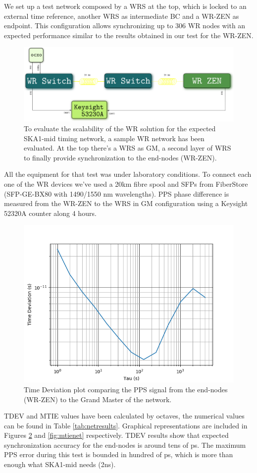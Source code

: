 We set up a test network composed by a WRS at the top, which is locked to an 
external time reference, another WRS as intermediate BC and a WR-ZEN as 
endpoint. This configuration allows synchronizing up to 306 WR nodes with an 
expected performance similar to the results obtained in our test for the WR-ZEN.

\begin{figure}
	\centering
	\includegraphics[width=0.7\linewidth]{img/prueba_red}
	\caption[WR Scalability test's setup for SKA]{To evaluate the scalability 
	of the WR solution for the expected SKA1-mid timing network, a sample WR 
	network has been evaluated. At the top there's a WRS as GM, a second layer 
	of WRS to finally provide synchronization to the end-nodes (WR-ZEN).}
	\label{fig:pruebared}
\end{figure}


All the equipment for that test was under laboratory conditions. To connect 
each one of the WR devices we've used a 20km fibre spool and SFPs from 
FiberStore (SFP-GE-BX80 with 1490/1550 nm wavelengths). PPS phase difference is 
measured from the WR-ZEN to the WRS in GM configuration using a Keysight 52320A 
counter along 4 hours.

\begin{figure}
	\centering
	\includegraphics[width=0.5\linewidth]{img/tdev_exp3}
	\caption[TDEV of the end-nodes in the scalability test.]{Time Deviation 
	plot comparing the PPS signal from the end-nodes (WR-ZEN) to the Grand 
	Master of the network.}
	\label{fig:tdevnet}
\end{figure}

TDEV and MTIE values have been calculated by octaves, the numerical 
values can 
be found in Table \ref{tab:netresults}. Graphical representations are included 
in Figures \ref{fig:tdevnet} and \ref{fig:mtienet} respectively. TDEV results 
show that expected synchronization accuracy for the end-nodes is around tens of 
ps. The maximum PPS error during this test is bounded in hundred of ps, which 
is more than enough what SKA1-mid needs (2ns).

